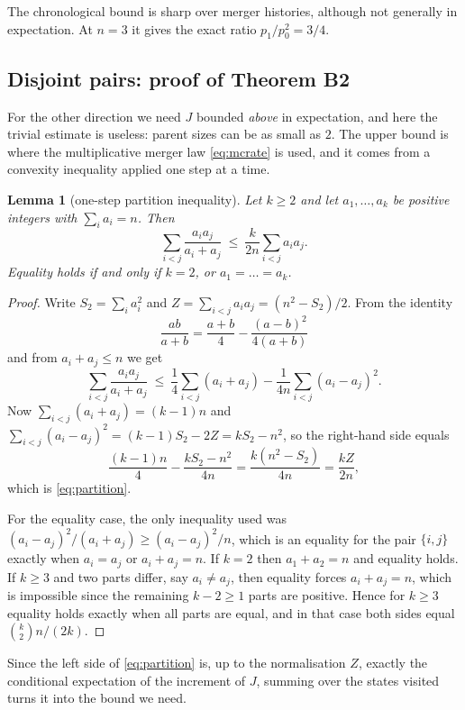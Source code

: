 \documentclass[11pt,a4paper]{amsart}
\theoremstyle{plain}
\newtheorem{lemma}[theorem]{Lemma}
\theoremstyle{definition}
\theoremstyle{remark}
\begin{document}
The chronological bound is sharp over merger histories, although not generally
in expectation. At $n=3$ it gives the exact ratio $p_1/p_0^2=3/4$.

\subsection{Disjoint pairs: proof of Theorem B2}

For the other direction we need $J$ bounded \emph{above} in expectation, and here
the trivial estimate is useless: parent sizes can be as small as $2$. The upper
bound is where the multiplicative merger law \eqref{eq:mcrate} is used, and it
comes from a convexity inequality applied one step at a time.

\begin{lemma}[one-step partition inequality]
\label{lem:partition}
Let $k\ge2$ and let $a_1,\dots,a_k$ be positive integers with $\sum_i a_i=n$.
Then
\begin{equation}
\label{eq:partition}
\sum_{i<j}\frac{a_ia_j}{a_i+a_j}\ \le\ \frac{k}{2n}\sum_{i<j}a_ia_j .
\end{equation}
Equality holds if and only if $k=2$, or $a_1=\dots=a_k$.
\end{lemma}

\begin{proof}
Write $S_2=\sum_ia_i^2$ and $Z=\sum_{i<j}a_ia_j=(n^2-S_2)/2$. From the identity
\[
\frac{ab}{a+b}=\frac{a+b}4-\frac{(a-b)^2}{4(a+b)}
\]
and from $a_i+a_j\le n$ we get
\[
\sum_{i<j}\frac{a_ia_j}{a_i+a_j}
\ \le\ \frac14\sum_{i<j}(a_i+a_j)-\frac1{4n}\sum_{i<j}(a_i-a_j)^2 .
\]
Now $\sum_{i<j}(a_i+a_j)=(k-1)n$ and
$\sum_{i<j}(a_i-a_j)^2=(k-1)S_2-2Z=kS_2-n^2$, so the right-hand side equals
\[
\frac{(k-1)n}{4}-\frac{kS_2-n^2}{4n}=\frac{k(n^2-S_2)}{4n}=\frac{kZ}{2n},
\]
which is \eqref{eq:partition}.

For the equality case, the only inequality used was
$(a_i-a_j)^2/(a_i+a_j)\ge(a_i-a_j)^2/n$, which is an equality for the pair
$\{i,j\}$ exactly when $a_i=a_j$ or $a_i+a_j=n$. If $k=2$ then $a_1+a_2=n$ and
equality holds. If $k\ge3$ and two parts differ, say $a_i\ne a_j$, then equality
forces $a_i+a_j=n$, which is impossible since the remaining $k-2\ge1$ parts are
positive. Hence for $k\ge3$ equality holds exactly when all parts are equal, and
in that case both sides equal $\binom k2 n/(2k)$.
\end{proof}

Since the left side of \eqref{eq:partition} is, up to the normalisation $Z$,
exactly the conditional expectation of the increment of $J$, summing over the
states visited turns it into the bound we need.
\end{document}

